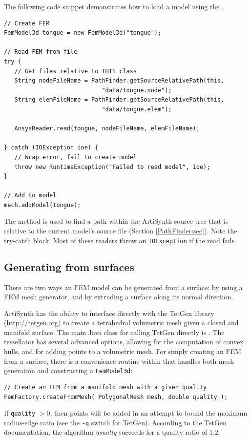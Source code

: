 The following code snippet demonstrates how to load a model using the
.
\begin{lstlisting}[]
// Create FEM
FemModel3d tongue = new FemModel3d("tongue");
      
// Read FEM from file
try {
   // Get files relative to THIS class
   String nodeFileName = PathFinder.getSourceRelativePath(this, 
                            "data/tongue.node");
   String elemFileName = PathFinder.getSourceRelativePath(this, 
                            "data/tongue.elem");

   AnsysReader.read(tongue, nodeFileName, elemFileName);

} catch (IOException ioe) {         
   // Wrap error, fail to create model
   throw new RuntimeException("Failed to read model", ioe);
}
      
// Add to model
mech.addModel(tongue);
\end{lstlisting}
The method
is used to find a path within the ArtiSynth source tree that is
relative to the current model's source file (Section
\ref{PathFinder:sec}). Note the try-catch block.  Most of these
readers throw an {\tt IOException} if the read fails.

\subsection{Generating from surfaces}

There are two ways an FEM model can be generated from a surface: by using a
FEM mesh generator, and by extruding a surface along its normal direction.

ArtiSynth has the ability to interface directly with the TetGen library 
(\href{http://tetgen.org}{http://tetgen.org}) to create a tetrahedral 
volumetric mesh given a closed and manifold surface.  The main Java class for
calling TetGen directly is .
The tessellator has several advanced options, allowing for the computation of 
convex hulls, and for adding points to a volumetric mesh.  For simply creating
an FEM from a surface, there is a convenience routine within 
 that handles both mesh 
generation and constructing a {\tt FemModel3d}:
\begin{lstlisting}[]
// Create an FEM from a manifold mesh with a given quality
FemFactory.createFromMesh( PolygonalMesh mesh, double quality );
\end{lstlisting}
If {\tt quality} $>0$, then points will be added in an attempt to bound the
maximum radius-edge ratio (see the {\tt-q} switch for TetGen).  According
to the TetGen documentation, the algorithm \emph{usually} succeeds for a 
quality ratio of 1.2.


